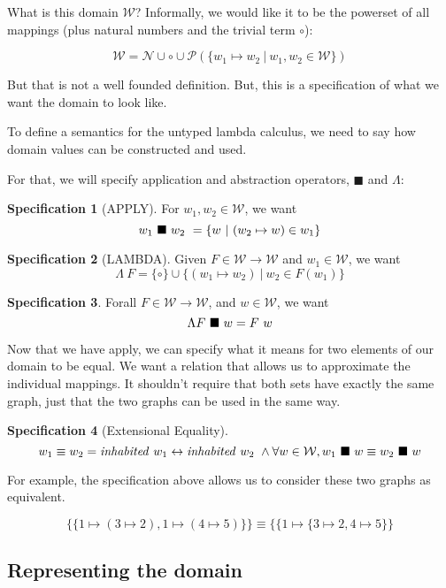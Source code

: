 \documentclass{article}
\theoremstyle{definition}
\newtheorem{spec}{Specification}[section]
\begin{document}
What is this domain $\mathcal{W}$? Informally, we would like it to be the
powerset of all mappings (plus natural numbers and the trivial term $\circ$):

\[ \mathcal{W} = \mathcal{N} \cup \circ \cup \mathscr{P}( 
  \{ w_1 \mapsto w_2\ |\ w_1, w_2 \in \mathcal{W} \} )  \] 

\noindent But that is not a well founded definition. 
But, this is a specification of what we want the domain to look like.

To define a semantics for the untyped lambda calculus, we need to say how domain 
values can be constructed and used.

For that, we will specify application and abstraction operators,
$\blacksquare$ and $\Lambda$:

\begin{spec}[APPLY] For $w_1, w_2 \in \mathcal{W}$, we want
\[  {w_1}\ \blacksquare\ {w_2}\ = \{ w\ |\ (w_2 \mapsto w) \in w_1 \} \]
\end{spec}

\begin{spec}[LAMBDA]
  Given $F \in \mathcal{W} \rightarrow \mathcal{W}$ and
  $w_1 \in \mathcal{W}$, we want
\[ \Lambda\ F = \{ \circ \} \cup \{ (w_1 \mapsto w_2)\ |\ w_2 \in F(w_1) \} \]
\end{spec}


\begin{spec}
Forall $F \in \mathcal{W} \rightarrow \mathcal{W}$, and 
  $w\in\mathcal{W}$, we want
  \[ \apply{\Lambda F}{w} = F\ w \]
\end{spec}

Now that we have apply, we can specify what it means for two elements of 
our domain to be equal. We want a relation that allows us to approximate 
the individual mappings. It shouldn't require that both sets have exactly 
the same graph, just that the two graphs can be used in the same way. 
\begin{spec}[Extensional Equality]
\[ w_1 \equiv w_2 = \mathit{inhabited}\ {w_1} \leftrightarrow \mathit{inhabited}\ {w_2}\ \wedge
  \forall w \in \mathcal{W}, {w_1}\ \blacksquare\ {w} \equiv {w_2}\ \blacksquare\ {w} \]
\end{spec}
  
For example, the specification above allows us to consider these two graphs as 
equivalent.

\[
\{ \{ 1 \mapsto (3 \mapsto 2), 1 \mapsto (4 \mapsto 5) \} \}
\equiv
\{ \{1 \mapsto \{ 3 \mapsto 2, 4 \mapsto 5 \} \}
\]

\subsection{Representing the domain}
\end{document}

